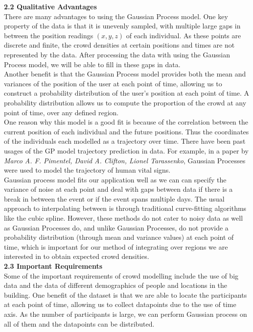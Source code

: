 \documentclass[letterpaper]{article}
\begin{document}
{\bf2.2  Qualitative Advantages} \\

There are many advantages to using the Gaussian Process model. One key property of the data is that it is unevenly sampled, with multiple large gaps in between the position readings $(x,y,z)$ of each individual. As these points are discrete and finite, the crowd densities at certain positions and times are not represented by the data. After processing the data with using the Gaussian Process model, we will be able to fill in these gaps in data. \\

Another benefit is that the Gaussian Process model provides both the mean and variances of the position of the user at each point of time, allowing us to construct a probability distribution of the user's position at each point of time. A probability distribution allows us to compute the proportion of the crowd at any point of time, over any defined region. \\

One reason why this model is a good fit is because of the correlation between the current position of each individual and the future positions. Thus the coordinates of the individuals each modelled as a trajectory over time. There have been past usages of the GP model trajectory prediction in data. For example, in a paper by {\it Marco A. F. Pimentel, David A. Clifton, Lionel Tarassenko}, Gaussian Processes were used to model the trajectory of human vital signs. \\

Gaussian process model fits our application well as we can can specify the variance of noise at each point and deal with gaps between data if there is a break in between the event or if the event spans multiple days. The usual approach to interpolating between is through traditional curve-fitting algorithms like the cubic spline. However, these methods do not cater to noisy data as well as Gaussian Processes do, and unlike Gaussian Processes, do not provide a probability distribution (through mean and variance values) at each point of time, which is important for our method of integrating over regions we are interested in to obtain expected crowd densities.\\


{\bf2.3  Important Requirements} \\

Some of the important requirements of crowd modelling include the use of big data and the data of different demographics of people and locations in the building. One benefit of the dataset is that we are able to locate the participants at each point of time, allowing us to collect datapoints due to the use of time axis. As the number of participants is large, we can perform Gaussian process on all of them and the datapoints can be distributed. \\
\end{document}

